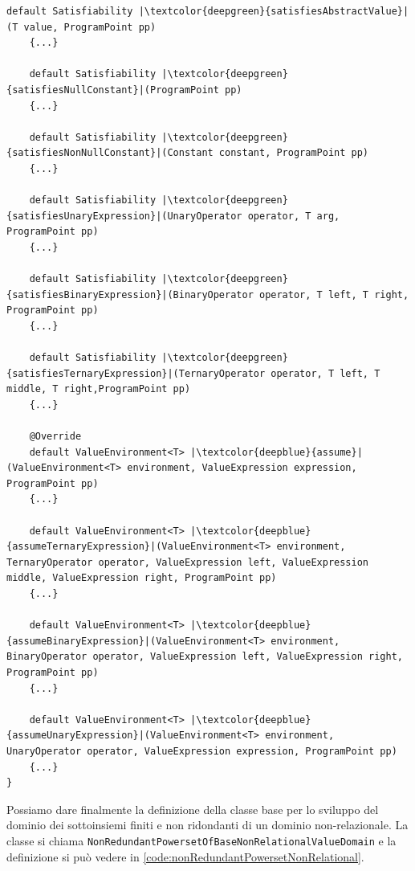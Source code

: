 \begin{lstlisting}[belowskip=-1.1 \baselineskip, escapechar=|]
    default Satisfiability |\textcolor{deepgreen}{satisfiesAbstractValue}|(T value, ProgramPoint pp) 
    {...}
    
    default Satisfiability |\textcolor{deepgreen}{satisfiesNullConstant}|(ProgramPoint pp)
    {...}
    
    default Satisfiability |\textcolor{deepgreen}{satisfiesNonNullConstant}|(Constant constant, ProgramPoint pp) 
    {...}
    
    default Satisfiability |\textcolor{deepgreen}{satisfiesUnaryExpression}|(UnaryOperator operator, T arg, ProgramPoint pp) 
    {...}
    
    default Satisfiability |\textcolor{deepgreen}{satisfiesBinaryExpression}|(BinaryOperator operator, T left, T right, ProgramPoint pp) 
    {...}

    default Satisfiability |\textcolor{deepgreen}{satisfiesTernaryExpression}|(TernaryOperator operator, T left, T middle, T right,ProgramPoint pp) 
    {...}
    
    @Override
    default ValueEnvironment<T> |\textcolor{deepblue}{assume}|(ValueEnvironment<T> environment, ValueExpression expression, ProgramPoint pp) 
    {...}
    
    default ValueEnvironment<T> |\textcolor{deepblue}{assumeTernaryExpression}|(ValueEnvironment<T> environment, TernaryOperator operator, ValueExpression left, ValueExpression middle, ValueExpression right, ProgramPoint pp) 
    {...}
    
    default ValueEnvironment<T> |\textcolor{deepblue}{assumeBinaryExpression}|(ValueEnvironment<T> environment, BinaryOperator operator, ValueExpression left, ValueExpression right, ProgramPoint pp) 
    {...}
    
    default ValueEnvironment<T> |\textcolor{deepblue}{assumeUnaryExpression}|(ValueEnvironment<T> environment, UnaryOperator operator, ValueExpression expression, ProgramPoint pp) 
    {...}
}
\end{lstlisting}

Possiamo dare finalmente la definizione della classe base per lo sviluppo del dominio dei sottoinsiemi finiti e non ridondanti di un dominio non-relazionale. La classe si chiama \texttt{NonRedundantPowersetOfBaseNonRelationalValueDomain} e la definizione si può vedere in \ref{code:nonRedundantPowersetNonRelational}. 

